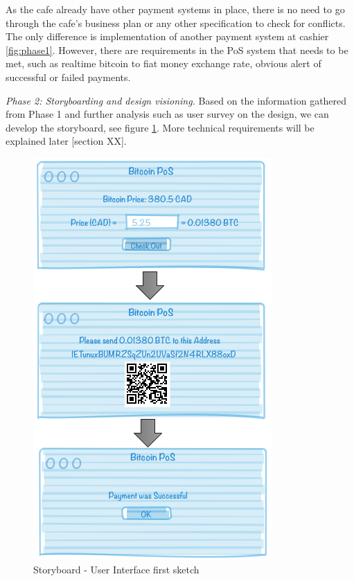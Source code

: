 As the cafe already have other payment systems in place, there is no need to go through the cafe's business plan or any other specification to check for conflicts. The only difference is implementation of another payment system at cashier \ref{fig:phase1}.
However, there are requirements in the PoS system that needs to be met, such as realtime bitcoin to fiat money exchange rate, obvious alert of successful or failed payments.


\textit{Phase 2: Storyboarding and design visioning.}
Based on the information gathered from Phase 1 and further analysis such as user survey on the design, we can develop the storyboard, see figure \ref{fig:storyboard}. More technical requirements will be explained later [section XX].

\begin{figure}[h]
\centering
\includegraphics[scale=0.5]{fig/RE_Scenario_Interface}
  \caption{Storyboard - User Interface first sketch}
\label{fig:storyboard}
\end{figure}


